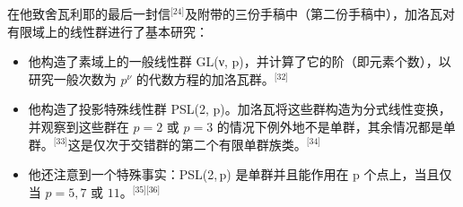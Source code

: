 在他致舍瓦利耶的最后一封信\(^\text{[24]}\)及附带的三份手稿中（第二份手稿中），加洛瓦对有限域上的线性群进行了基本研究：
\begin{itemize}
\item 他构造了素域上的一般线性群 GL(ν, p)，并计算了它的阶（即元素个数），以研究一般次数为 $p^\nu$ 的代数方程的加洛瓦群。\(^\text{[32]}\)
\item 他构造了投影特殊线性群 PSL(2, p)。加洛瓦将这些群构造为分式线性变换，并观察到这些群在 $p = 2$ 或 $p = 3$ 的情况下例外地不是单群，其余情况都是单群。\(^\text{[33]}\)这是仅次于交错群的第二个有限单群族类。\(^\text{[34]}\)
\item 他还注意到一个特殊事实：PSL(2, p) 是单群并且能作用在 p 个点上，当且仅当 $p = 5, 7$ 或 $11$。\(^\text{[35][36]}\)
\end{itemize}